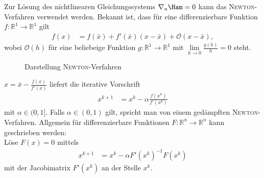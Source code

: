 Zur Lösung des nichtlinearen Gleichungssystems $\nabla_u \Ham =0$ kann das \textsc{Newton}-Verfahren verwendet werden. Bekannt ist, dass für eine
differenzierbare Funktion $f:\mathbb{R}^1\rightarrow\mathbb{R}^1$ gilt
\begin{align*}
	f(x) & = f(\bar{x})+f'(\bar{x})(x-\bar{x})+\mathcal{O}(x-\bar{x}),
\end{align*}
wobei $\mathcal{O}(h)$ für eine beliebeige Funktion $g:\mathbb{R}^1\rightarrow\mathbb{R}^1$ mit $\lim\limits_{h\rightarrow 0}\frac{g(h)}{h}=0$
steht.\\
\begin{figure}[htb]
	\centering
	
	\caption{Darstellung \textsc{Newton}-Verfahren}
	\label{fig:kap_2_fallc_newton}
\end{figure}
$x=\bar{x}-\frac{f(x)}{f'(x)}$ liefert die iterative Vorschrift
\begin{align*}
	x^{k+1} & = x^k - \alpha\frac{f\left(x^k\right)}{f'\left(x^k \right)}
\end{align*}
mit $\alpha\in(0,1]$. Falls $\alpha\in(0,1)$ gilt, spricht man von einem gedämpften \textsc{Newton}-Verfahren. Allgemein für differenzierbare
Funktionen $F:\mathbb{R}^n\rightarrow\mathbb{R}^n$ kann geschrieben werden:\\
Löse $F(x)=0$ mittels
\begin{align*}
	x^{k+1} & = x^k - \alpha F'\left(x^k\right)^{-1}F(x^k)
\end{align*}
mit der Jacobimatrix $F'\left(x^k\right)$ an der Stelle $x^k$.

